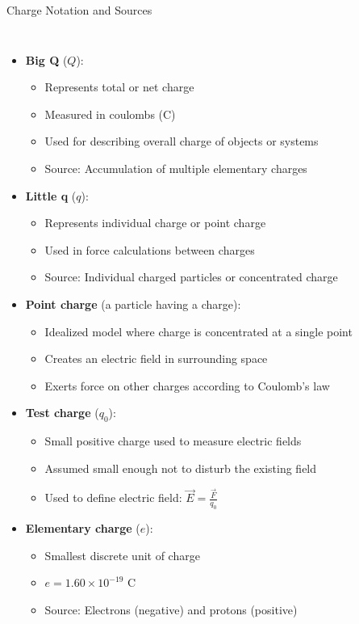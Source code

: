 \documentclass{beamer}
\begin{document}
\begin{frame}{Charge Notation and Sources}
    \begin{columns}
        \begin{itemize}
            \item \textbf{Big Q} ($Q$):
                \begin{itemize}
                    \item Represents total or net charge
                    \item Measured in coulombs (C)
                    \item Used for describing overall charge of objects or systems
                    \item Source: Accumulation of multiple elementary charges
                \end{itemize}
            \item \textbf{Little q} ($q$):
                \begin{itemize}
                    \item Represents individual charge or point charge
                    \item Used in force calculations between charges
                    \item Source: Individual charged particles or concentrated charge
                \end{itemize}
            \item \textbf{Point charge} (a particle having a charge):
                \begin{itemize}
                    \item Idealized model where charge is concentrated at a single point
                    \item Creates an electric field in surrounding space
                    \item Exerts force on other charges according to Coulomb's law
                \end{itemize}
            \item \textbf{Test charge} ($q_0$):
                \begin{itemize}
                    \item Small positive charge used to measure electric fields
                    \item Assumed small enough not to disturb the existing field
                    \item Used to define electric field: $\vec{E} = \frac{\vec{F}}{q_0}$
                \end{itemize}
            \item \textbf{Elementary charge} ($e$):
                \begin{itemize}
                    \item Smallest discrete unit of charge
                    \item $e = 1.60 \times 10^{-19}$ C
                    \item Source: Electrons (negative) and protons (positive)
                \end{itemize}
        \end{itemize}
        

\end{columns}
\end{frame}
\end{document}
